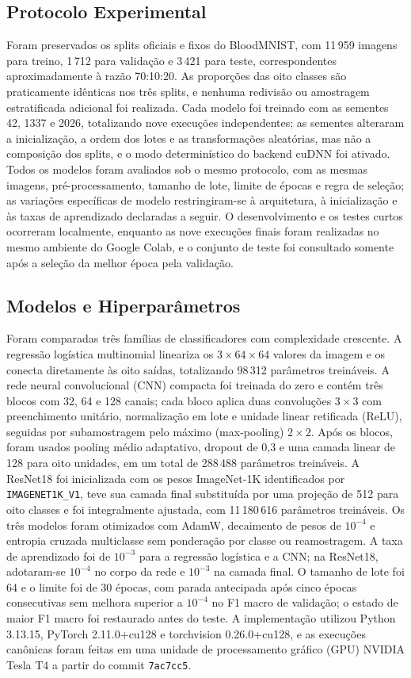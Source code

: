 \documentclass[conference]{IEEEtran}
\begin{document}
\subsection{Protocolo Experimental}
Foram preservados os splits oficiais e fixos do BloodMNIST, com 11\,959 imagens para treino, 1\,712 para validação e 3\,421 para teste, correspondentes aproximadamente à razão 70:10:20.
As proporções das oito classes são praticamente idênticas nos três splits, e nenhuma redivisão ou amostragem estratificada adicional foi realizada.
Cada modelo foi treinado com as sementes 42, 1337 e 2026, totalizando nove execuções independentes; as sementes alteraram a inicialização, a ordem dos lotes e as transformações aleatórias, mas não a composição dos splits, e o modo determinístico do backend cuDNN foi ativado.
Todos os modelos foram avaliados sob o mesmo protocolo, com as mesmas imagens, pré-processamento, tamanho de lote, limite de épocas e regra de seleção; as variações específicas de modelo restringiram-se à arquitetura, à inicialização e às taxas de aprendizado declaradas a seguir.
O desenvolvimento e os testes curtos ocorreram localmente, enquanto as nove execuções finais foram realizadas no mesmo ambiente do Google Colab, e o conjunto de teste foi consultado somente após a seleção da melhor época pela validação.

\subsection{Modelos e Hiperparâmetros}
Foram comparadas três famílias de classificadores com complexidade crescente.
A regressão logística multinomial lineariza os $3\times64\times64$ valores da imagem e os conecta diretamente às oito saídas, totalizando 98\,312 parâmetros treináveis.
A rede neural convolucional (CNN) compacta foi treinada do zero e contém três blocos com 32, 64 e 128 canais; cada bloco aplica duas convoluções $3\times3$ com preenchimento unitário, normalização em lote e unidade linear retificada (ReLU), seguidas por subamostragem pelo máximo (max-pooling) $2\times2$.
Após os blocos, foram usados pooling médio adaptativo, dropout de 0,3 e uma camada linear de 128 para oito unidades, em um total de 288\,488 parâmetros treináveis.
A ResNet18 \cite{he2016deep} foi inicializada com os pesos ImageNet-1K \cite{deng2009imagenet} identificados por \texttt{IMAGENET1K\_V1}, teve sua camada final substituída por uma projeção de 512 para oito classes e foi integralmente ajustada, com 11\,180\,616 parâmetros treináveis.
Os três modelos foram otimizados com AdamW, decaimento de pesos de $10^{-4}$ e entropia cruzada multiclasse sem ponderação por classe ou reamostragem.
A taxa de aprendizado foi de $10^{-3}$ para a regressão logística e a CNN; na ResNet18, adotaram-se $10^{-4}$ no corpo da rede e $10^{-3}$ na camada final.
O tamanho de lote foi 64 e o limite foi de 30 épocas, com parada antecipada após cinco épocas consecutivas sem melhora superior a $10^{-4}$ no F1 macro de validação; o estado de maior F1 macro foi restaurado antes do teste.
A implementação utilizou Python 3.13.15, PyTorch 2.11.0+cu128 e torchvision 0.26.0+cu128, e as execuções canônicas foram feitas em uma unidade de processamento gráfico (GPU) NVIDIA Tesla T4 a partir do commit \texttt{7ac7cc5}.
\end{document}
